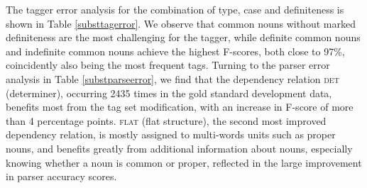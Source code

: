 \documentclass[a4paper,12pt,english]{book}
\begin{document}

The tagger error analysis for the combination of type, case and definiteness is
shown in Table \ref{substtagerror}. We observe that common nouns without marked
definiteness are the most challenging for the tagger, while definite common
nouns and indefinite common nouns achieve the highest F-scores, both close to
97\%, coincidently also being the most frequent tags. Turning to the parser
error analysis in Table \ref{substparseerror}, we find that the dependency
relation \textsc{det} (determiner), occurring 2435 times in the gold standard
development data, benefits most from the tag set modification, with an increase
in F-score of more than 4 percentage points. \textsc{flat} (flat structure),
the second most improved dependency relation, is mostly assigned to multi-words
units such as proper nouns, and benefits greatly from additional information
about nouns, especially knowing whether a noun is common or proper, reflected
in the large improvement in parser accuracy scores.
\end{document}
